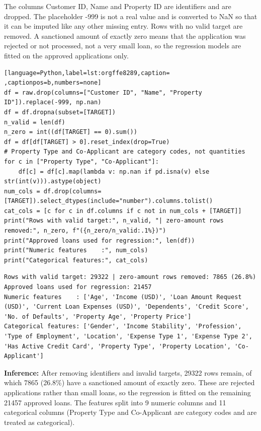 \documentclass[11pt]{article}
\begin{document}
The columns Customer ID, Name and Property ID are identifiers and are dropped. The
placeholder -999 is not a real value and is converted to NaN so that it can be imputed like
any other missing entry. Rows with no valid target are removed. A sanctioned amount of
exactly zero means that the application was rejected or not processed, not a very small
loan, so the regression models are fitted on the approved applications only.
\begin{lstlisting}[language=Python,label=lst:orgffe8289,caption= ,captionpos=b,numbers=none]
df = raw.drop(columns=["Customer ID", "Name", "Property ID"]).replace(-999, np.nan)
df = df.dropna(subset=[TARGET])
n_valid = len(df)
n_zero = int((df[TARGET] == 0).sum())
df = df[df[TARGET] > 0].reset_index(drop=True)
# Property Type and Co-Applicant are category codes, not quantities
for c in ["Property Type", "Co-Applicant"]:
    df[c] = df[c].map(lambda v: np.nan if pd.isna(v) else str(int(v))).astype(object)
num_cols = df.drop(columns=[TARGET]).select_dtypes(include="number").columns.tolist()
cat_cols = [c for c in df.columns if c not in num_cols + [TARGET]]
print("Rows with valid target:", n_valid, "| zero-amount rows removed:", n_zero, f"({n_zero/n_valid:.1%})")
print("Approved loans used for regression:", len(df))
print("Numeric features    :", num_cols)
print("Categorical features:", cat_cols)
\end{lstlisting}

\begin{verbatim}
Rows with valid target: 29322 | zero-amount rows removed: 7865 (26.8%)
Approved loans used for regression: 21457
Numeric features    : ['Age', 'Income (USD)', 'Loan Amount Request (USD)', 'Current Loan Expenses (USD)', 'Dependents', 'Credit Score', 'No. of Defaults', 'Property Age', 'Property Price']
Categorical features: ['Gender', 'Income Stability', 'Profession', 'Type of Employment', 'Location', 'Expense Type 1', 'Expense Type 2', 'Has Active Credit Card', 'Property Type', 'Property Location', 'Co-Applicant']
\end{verbatim}


\textbf{Inference:} After removing identifiers and invalid targets, 29322 rows remain, of which 7865 (26.8\%)
have a sanctioned amount of exactly zero. These are rejected applications rather than small
loans, so the regression is fitted on the remaining 21457 approved loans. The features split
into 9 numeric columns and 11 categorical columns (Property Type and Co-Applicant are
category codes and are treated as categorical).
\end{document}
